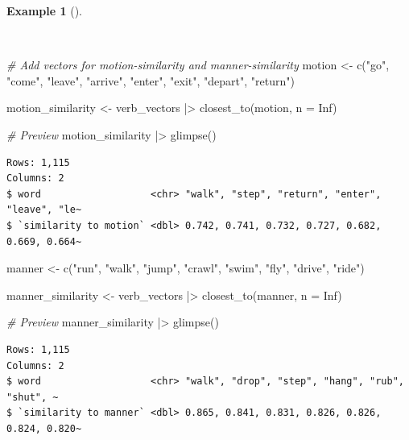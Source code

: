\documentclass[
  letterpaper,
]{latex/krantz}
\newenvironment{Shaded}{\begin{snugshade}}{\end{snugshade}}
\newcommand{\AttributeTok}[1]{\textcolor[rgb]{0.00,0.00,0.00}{#1}}
\newcommand{\CommentTok}[1]{\textcolor[rgb]{0.00,0.00,0.00}{\textit{#1}}}
\newcommand{\ConstantTok}[1]{\textcolor[rgb]{0.00,0.00,0.00}{#1}}
\newcommand{\FunctionTok}[1]{\textcolor[rgb]{0.00,0.00,0.00}{#1}}
\newcommand{\NormalTok}[1]{\textcolor[rgb]{0.00,0.00,0.00}{#1}}
\newcommand{\OtherTok}[1]{\textcolor[rgb]{0.00,0.00,0.00}{#1}}
\newcommand{\SpecialCharTok}[1]{\textcolor[rgb]{0.00,0.00,0.00}{#1}}
\newcommand{\StringTok}[1]{\textcolor[rgb]{0.00,0.00,0.00}{#1}}
\theoremstyle{definition}
\newtheorem{example}{Example}[chapter]
\theoremstyle{remark}
\begin{document}
\begin{example}[]\protect\hypertarget{exm-explore-masc-vsm-word2vec-manner-motion}{}\label{exm-explore-masc-vsm-word2vec-manner-motion}

~

\begin{Shaded}
\begin{Highlighting}[]
\CommentTok{\# Add vectors for motion{-}similarity and manner{-}similarity}
\NormalTok{motion }\OtherTok{\textless{}{-}}
  \FunctionTok{c}\NormalTok{(}\StringTok{"go"}\NormalTok{, }\StringTok{"come"}\NormalTok{, }\StringTok{"leave"}\NormalTok{, }\StringTok{"arrive"}\NormalTok{, }\StringTok{"enter"}\NormalTok{, }\StringTok{"exit"}\NormalTok{, }\StringTok{"depart"}\NormalTok{, }\StringTok{"return"}\NormalTok{)}

\NormalTok{motion\_similarity }\OtherTok{\textless{}{-}}
\NormalTok{  verb\_vectors }\SpecialCharTok{|\textgreater{}} \FunctionTok{closest\_to}\NormalTok{(motion, }\AttributeTok{n =} \ConstantTok{Inf}\NormalTok{)}

\CommentTok{\# Preview}
\NormalTok{motion\_similarity }\SpecialCharTok{|\textgreater{}} \FunctionTok{glimpse}\NormalTok{()}
\end{Highlighting}
\end{Shaded}

\begin{verbatim}
Rows: 1,115
Columns: 2
$ word                   <chr> "walk", "step", "return", "enter", "leave", "le~
$ `similarity to motion` <dbl> 0.742, 0.741, 0.732, 0.727, 0.682, 0.669, 0.664~
\end{verbatim}

\begin{Shaded}
\begin{Highlighting}[]
\NormalTok{manner }\OtherTok{\textless{}{-}}
  \FunctionTok{c}\NormalTok{(}\StringTok{"run"}\NormalTok{, }\StringTok{"walk"}\NormalTok{, }\StringTok{"jump"}\NormalTok{, }\StringTok{"crawl"}\NormalTok{, }\StringTok{"swim"}\NormalTok{, }\StringTok{"fly"}\NormalTok{, }\StringTok{"drive"}\NormalTok{, }\StringTok{"ride"}\NormalTok{)}

\NormalTok{manner\_similarity }\OtherTok{\textless{}{-}}
\NormalTok{  verb\_vectors }\SpecialCharTok{|\textgreater{}} \FunctionTok{closest\_to}\NormalTok{(manner, }\AttributeTok{n =} \ConstantTok{Inf}\NormalTok{)}

\CommentTok{\# Preview}
\NormalTok{manner\_similarity }\SpecialCharTok{|\textgreater{}} \FunctionTok{glimpse}\NormalTok{()}
\end{Highlighting}
\end{Shaded}

\begin{verbatim}
Rows: 1,115
Columns: 2
$ word                   <chr> "walk", "drop", "step", "hang", "rub", "shut", ~
$ `similarity to manner` <dbl> 0.865, 0.841, 0.831, 0.826, 0.826, 0.824, 0.820~
\end{verbatim}

\end{example}
\end{document}
